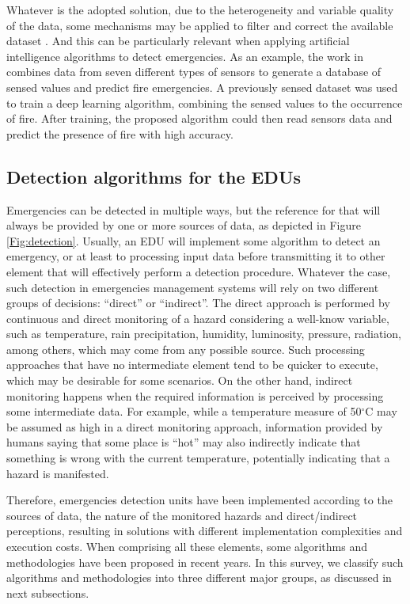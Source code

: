 \begin{refsection}
Whatever is the adopted solution, due to the heterogeneity and variable quality of the data, some mechanisms may be applied to filter and correct the available dataset \cite{bigdata1}. And this can be particularly relevant when applying artificial intelligence algorithms to detect emergencies. As an example, the work in \cite{fireBigdata1} combines data from seven different types of sensors to generate a database of sensed values and predict fire emergencies. A previously sensed dataset was used to train a deep learning algorithm, combining the sensed values to the occurrence of fire. After training, the proposed algorithm could then read sensors data and predict the presence of fire with high accuracy. 

\subsection{Detection algorithms for the EDUs}

Emergencies can be detected in multiple ways, but the reference for that will always be provided by one or more sources of data, as depicted in Figure \ref{Fig:detection}. Usually, an EDU will implement some algorithm to detect an emergency, or at least to processing input data before transmitting it to other element that will effectively perform a detection procedure. Whatever the case, such detection in emergencies management systems will rely on two different groups of decisions:  ``direct'' or ``indirect''. The direct approach is performed by continuous and direct monitoring of a hazard considering a well-know variable, such as temperature, rain precipitation, humidity, luminosity, pressure, radiation, among others, which may come from any possible source. Such processing approaches that have no intermediate element tend to be quicker to execute, which may be desirable for some scenarios. On the other hand, indirect monitoring happens when the required information is perceived by processing some intermediate data. For example, while a temperature measure of 50$^{\circ}$C may be assumed as high in a direct monitoring approach, information provided by humans saying that some place is ``hot'' may also indirectly indicate that something is wrong with the current temperature, potentially indicating that a hazard is manifested. 

Therefore, emergencies detection units have been implemented according to the sources of data, the nature of the monitored hazards and direct/indirect perceptions, resulting in solutions with different implementation complexities and execution costs. When comprising all these elements, some algorithms and methodologies have been proposed in recent years. In this survey, we classify such algorithms and methodologies into three different major groups, as discussed in next subsections.


\end{refsection}
